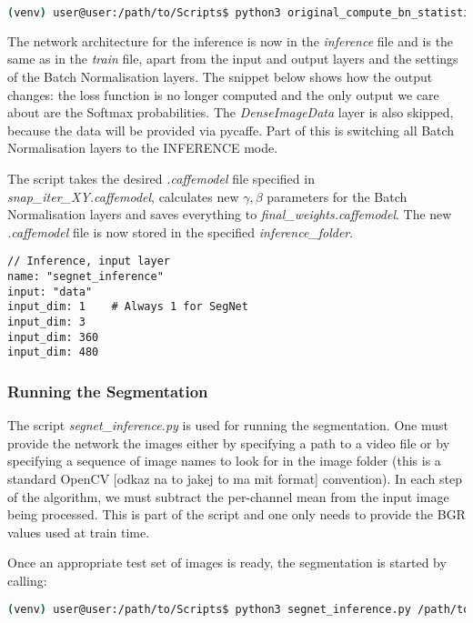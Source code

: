 \begin{lstlisting}[language=bash]
(venv) user@user:/path/to/Scripts$ python3 original_compute_bn_statistics.py /path/to/train.prototxt /path/to/snap_iter_XY.caffemodel /path/to/inference_folder
\end{lstlisting}

The network architecture for the inference is now in the \textit{inference} file and is the same as in the \textit{train} file, apart from the input and output layers and the settings of the Batch Normalisation layers. The snippet below shows how the output changes: the loss function is no longer computed and the only output we care about are the Softmax probabilities. The \textit{DenseImageData} layer is also skipped, because the data will be provided via pycaffe. Part of this is switching all Batch Normalisation layers to the INFERENCE mode.

The script takes the desired \textit{.caffemodel} file specified in \textit{snap\_iter\_XY.caffemodel}, calculates new $ \gamma, \beta $ parameters for the Batch Normalisation layers and saves everything to \textit{final\_weights.caffemodel}. The new \textit{.caffemodel} file is now stored in the specified \textit{inference\_folder}.

\begin{lstlisting}
// Inference, input layer
name: "segnet_inference"
input: "data"
input_dim: 1	# Always 1 for SegNet
input_dim: 3
input_dim: 360
input_dim: 480
\end{lstlisting}

\subsubsection{Running the Segmentation}

The script \textit{segnet\_inference.py} is used for running the segmentation. One must provide the network the images either by specifying a path to a video file or by specifying a sequence of image names to look for in the image folder (this is a standard OpenCV [odkaz na to jakej to ma mit format] convention). In each step of the algorithm, we must subtract the per-channel mean from the input image being processed. This is part of the script and one only needs to provide the BGR values used at train time.

Once an appropriate test set of images is ready, the segmentation is started by calling:

\begin{lstlisting}[language=bash]
(venv) user@user:/path/to/Scripts$ python3 segnet_inference.py /path/to/inference.prototxt /path/to/final_weights.caffemodel /path/to/videofile.avi 
\end{lstlisting}

